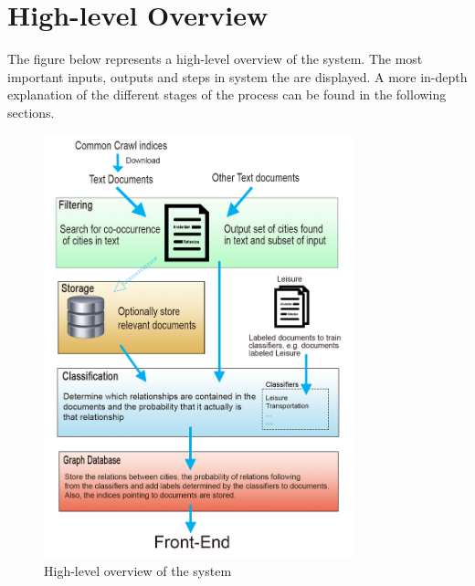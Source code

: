 \section{High-level Overview}
The figure below represents a high-level overview of the system. The most important inputs, outputs and steps in system the are displayed. A more in-depth explanation of the different stages of the process can be found in the following sections.

\begin{figure}[H]
\centering
\includegraphics[width=0.8\textwidth]{System-overview-3}
\caption{High-level overview of the system}
\label{fig:overview}
\end{figure}